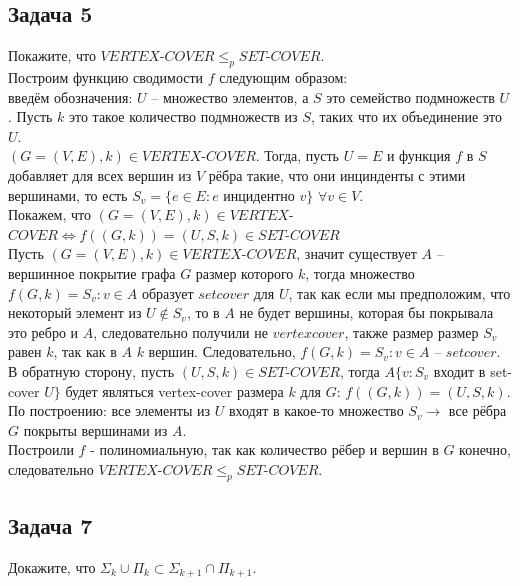 \documentclass[a4paper,12pt]{article} %
\begin{document}
\subsection*{Задача 5}
Покажите, что $VERTEX$-$COVER \leqslant_p SET$-$COVER$. \\

Построим функцию сводимости $ f $ следующим образом:\\
введём обозначения: $ U $ -- множество элементов, а $ S $ это семейство подмножеств $ U $. Пусть $ k $ это такое количество подмножеств из $ S $, таких что их объединение это $ U $.\\
$(G=(V, E), k) \in VERTEX$-$COVER$. Тогда, пусть $U = E$ и функция $ f $ в $ S $ добавляет для всех вершин из $ V $ рёбра такие, что они инцинденты с этими вершинами, то есть 
$S_v = \{e \in E: e$ инцидентно $v\}$ $ \forall v \in V $.\\
Покажем, что $(G=(V, E), k) \in VERTEX$-$COVER \Leftrightarrow f((G, k)) = (U, S, k) \in SET$-$COVER$\\

Пусть $(G=(V, E), k) \in VERTEX$-$COVER$, значит существует $ A $ -- вершинное покрытие графа $ G $ размер которого $ k $, тогда множество $f(G,k) = S_v: v \in A$ образует $ setcover $ для $ U $, так как если мы предположим, что некоторый элемент из $ U \notin S_v$, то в $ A $ не будет вершины, которая бы покрывала это ребро и $ A $, следовательно получили не $ vertexcover $, также размер размер $ S_v $ равен $ k$, так как в $A$ $k$ вершин. Следовательно, $f(G,k) = S_v: v \in A$ -- $ setcover $.\\

В обратную сторону, пусть $(U, S, k) \in SET$-$COVER$, тогда $ A \{v:S_v$ входит в set-cover $U \}$ будет являться vertex-cover размера $k$ для $G$: $f((G, k)) = (U, S, k)$. По построению: все элементы из $ U $ входят в какое-то множество $ S_v \longrightarrow$ все рёбра $ G $ покрыты вершинами из $ A $.\\

Построили $ f $ - полиномиальную, так как количество рёбер и вершин в $ G $ конечно, следовательно $VERTEX$-$COVER \leqslant_p SET$-$COVER$.

\subsection*{Задача 7}
Докажите, что $\Sigma_k \cup \Pi_k \subset \Sigma_{k+1} \cap \Pi_{k+1}$. \\
\end{document}
